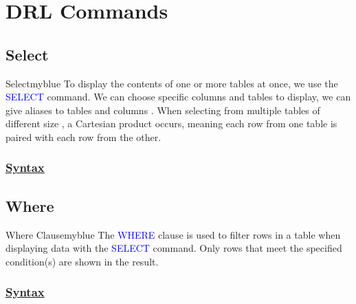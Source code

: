\section{DRL Commands}
\subsection{Select}


\begin{prettyBox}{Select}{myblue}
To display the contents of one or more tables at once, we use the \textcolor{blue}{SELECT} command. We can choose
specific columns and tables to display, we can give aliases to tables and columns . When selecting from multiple tables of different size
, a Cartesian product occurs, meaning each row from one table is paired with each row from the other.
\end{prettyBox}

\subsubsection*{\underline{Syntax}}



\subsection{Where}

\begin{prettyBox}{Where Clause}{myblue}
The \textcolor{blue}{WHERE} clause is used to filter rows in a table when displaying data with the
\textcolor{blue}{SELECT} command. Only rows that meet the specified condition(s) are shown in the result.
\end{prettyBox}

\subsubsection*{\underline{Syntax}}



